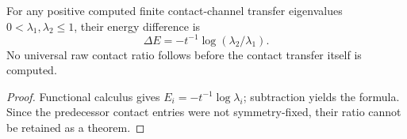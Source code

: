 \documentclass[12pt,a4paper]{article}
\begin{document}
\begin{corollary}
\label{p11:cor:nn-contact-ratio-log-hamiltonian-distinction}

For any positive computed finite contact-channel transfer eigenvalues \(0<\lambda_1,\lambda_2\le1\), their energy difference is
\[
\Delta E=-t^{-1}\log(\lambda_2/\lambda_1).
\]
No universal raw contact ratio follows before the contact transfer itself is computed.
\label{p11:eq:nn-contact-raw-ratio-nine-seven}
\label{p11:eq:nn-contact-transfer-exact-forms}
\label{p11:eq:nn-contact-hamiltonian-ratio-exact}
\end{corollary}
\begin{proof}

Functional calculus gives \(E_i=-t^{-1}\log\lambda_i\); subtraction yields the formula.  Since the predecessor contact entries were not symmetry-fixed, their ratio cannot be retained as a theorem.
\end{proof}
\end{document}
